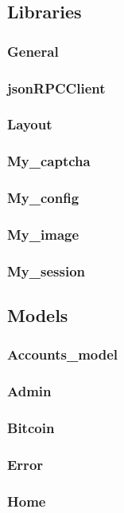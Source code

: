 \documentclass[11pt]{article} %
\begin{document}
\subsection{Libraries}
\subsubsection{General}
\subsubsection{jsonRPCClient}
\subsubsection{Layout}
\subsubsection{My\_captcha}
\subsubsection{My\_config}
\subsubsection{My\_image}
\subsubsection{My\_session}


\subsection{Models}
\subsubsection{Accounts\_model}
\subsubsection{Admin}
\subsubsection{Bitcoin}
\subsubsection{Error}
\subsubsection{Home}
\end{document}
